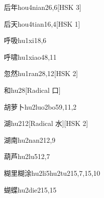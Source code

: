\begin{entry}{后年}{hou4nian2}{6,6}[HSK 3]
\end{entry}

\begin{entry}{后天}{hou4tian1}{6,4}[HSK 1]
\end{entry}

\begin{entry}{呼吸}{hu1xi1}{8,6}
\end{entry}

\begin{entry}{呼啸}{hu1xiao4}{8,11}
\end{entry}

\begin{entry}{忽然}{hu1ran2}{8,12}[HSK 2]
\end{entry}

\begin{entry}{和}{hu2}{8}[Radical 口]
\end{entry}

\begin{entry}{胡萝卜}{hu2luo2bo5}{9,11,2}
\end{entry}

\begin{entry}{湖}{hu2}{12}[Radical 水][HSK 2]
\end{entry}

\begin{entry}{湖南}{hu2nan2}{12,9}
\end{entry}

\begin{entry}{葫芦}{hu2lu5}{12,7}
\end{entry}

\begin{entry}{糊里糊涂}{hu2li5hu2tu2}{15,7,15,10}
\end{entry}

\begin{entry}{蝴蝶}{hu2die2}{15,15}
\end{entry}

